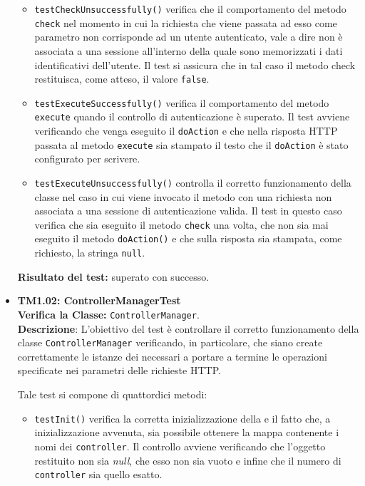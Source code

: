 \begin{itemize}
\begin{itemize}
\item \texttt{testCheckUnsuccessfully()} verifica che il comportamento del metodo \texttt{check} nel momento in cui la richiesta che viene passata ad esso come parametro non corrisponde ad un utente autenticato, vale a dire non è associata a una sessione all'interno della quale sono memorizzati i dati identificativi dell'utente. Il test si assicura che in tal caso il metodo check restituisca, come atteso, il valore \texttt{false}.

\item \texttt{testExecuteSuccessfully()} verifica il comportamento del metodo \texttt{execute} quando il controllo di autenticazione è superato. Il test avviene verificando che venga eseguito il \texttt{doAction} e che nella risposta HTTP passata al metodo \texttt{execute} sia  stampato il testo che il \texttt{doAction} è stato configurato per scrivere.

\item \texttt{testExecuteUnsuccessfully()}
controlla il corretto funzionamento della classe nel caso in cui viene invocato il metodo con una richiesta non associata a una sessione di autenticazione valida.
Il test in questo caso verifica che sia eseguito il metodo \texttt{check} una volta, che non sia mai eseguito il metodo \texttt{doAction()} e che sulla risposta sia stampata, come richiesto, la stringa \texttt{null}.

 \end{itemize}
\textbf{Risultato del test:} superato con successo.

\item[\passed] \textbf{TM1.02: ControllerManagerTest}\\
\textbf{Verifica la Classe:} \texttt{ControllerManager}.\\
\textbf{Descrizione}: L'obiettivo del test è controllare il corretto funzionamento della classe \texttt{ControllerManager} verificando, in particolare, che siano create correttamente le istanze dei  necessari a portare a termine le operazioni specificate nei parametri delle richieste HTTP\@.
 
Tale test si compone di quattordici metodi:
 \begin{itemize}
 
\item \texttt{testInit()} verifica la corretta inizializzazione della  e il fatto che, a inizializzazione avvenuta, sia possibile ottenere la mappa contenente i nomi dei \texttt{controller}. Il controllo avviene verificando che l'oggetto restituito non sia \textsl{null}, che esso non sia vuoto e infine che il numero di \texttt{controller} sia quello esatto.


\end{itemize}
\end{itemize}
